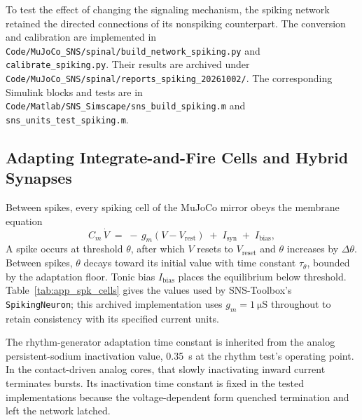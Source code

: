 To test the effect of changing the signaling mechanism, the spiking network retained the directed connections of its nonspiking counterpart. The conversion and calibration are implemented in \nolinkurl{Code/MuJoCo_SNS/spinal/build_network_spiking.py} and \nolinkurl{calibrate_spiking.py}. Their results are archived under \nolinkurl{Code/MuJoCo_SNS/spinal/reports_spiking_20261002/}. The corresponding Simulink blocks and tests are in \nolinkurl{Code/Matlab/SNS_Simscape/sns_build_spiking.m} and \nolinkurl{sns_units_test_spiking.m}.

\subsection{Adapting Integrate-and-Fire Cells and Hybrid Synapses}

Between spikes, every spiking cell of the MuJoCo mirror obeys the membrane equation
\begin{equation}
    C_{m}\,\dot{V} \;=\; -\,g_{m}\left(V - V_{\text{rest}}\right)
        \;+\; I_{\text{syn}} \;+\; I_{\text{bias}},
    \label{eq:app_lif}
\end{equation}
A spike occurs at threshold $\theta$, after which $V$ resets to $V_{\text{reset}}$ and $\theta$ increases by $\Delta\theta$. Between spikes, $\theta$ decays toward its initial value with time constant $\tau_{\theta}$, bounded by the adaptation floor. Tonic bias $I_{\text{bias}}$ places the equilibrium below threshold. Table~\ref{tab:app_spk_cells} gives the values used by SNS-Toolbox's \texttt{SpikingNeuron}; this archived implementation uses $g_m=\qty{1}{\micro\siemens}$ throughout to retain consistency with its specified current units.

The rhythm-generator adaptation time constant is inherited from the analog persistent-sodium inactivation value, \qty{0.35}{\second} at the rhythm test's operating point. In the contact-driven analog cores, that slowly inactivating inward current terminates bursts. Its inactivation time constant is fixed in the tested implementations because the voltage-dependent form quenched termination and left the network latched.

